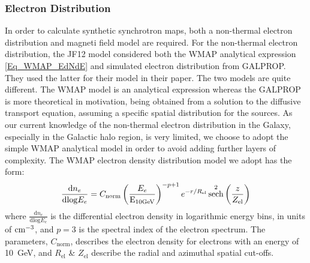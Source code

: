 \documentclass[usenatbib]{mnras}
\DeclareMathOperator{\sech}{sech}
\begin{document}
\subsubsection{Electron Distribution}

In order to calculate synthetic synchrotron maps, both a non-thermal electron distribution and magneti field model are required. For the non-thermal electron distribution, the JF12 model considered both the WMAP analytical expression \ref{Eq_WMAP_EdNdE} and simulated electron distribution from GALPROP. They used the latter for their model in their paper. The two models are quite different. The WMAP \cite{WMAP_Page} model is an analytical expression whereas the GALPROP \cite{Hammurabi} is more theoretical in motivation, being obtained from a solution to the diffusive transport equation, assuming a specific spatial distribution for the sources. As our current knowledge of the non-thermal electron distribution in the Galaxy, especially in the Galactic halo region, is very limited, we choose to adopt the simple WMAP analytical model in order to avoid adding further layers of complexity. The WMAP electron density distribution model we adopt has the form:
\begin{equation}\label{Eq_WMAP_EdNdE}
    \frac{\mathrm{d}n_e}{\mathrm{dlog}E_{e}} =     C_\mathrm{norm} \left(\frac{E_e}{\rm E_{\rm 10 GeV}}\right)^{-p+1} e^{-r/R_{\mathrm{el}}} \sech^2\left(\frac{z}{Z_{\mathrm{el}}}\right) 
\end{equation}
where $\frac{\mathrm{d}n_e}{\mathrm{dlog}E_{e}}$ is the differential electron density in logarithmic energy bins, in units of ${\rm cm}^{-3}$, and $p =3$ is the spectral index of the electron spectrum. The parameters, $C_\mathrm{norm}$, describes the electron density for electrons with an energy of 10~GeV, and $R_{\mathrm{el}}$ \& $Z_{\mathrm{el}}$ describe the radial and azimuthal spatial cut-offs. 
\end{document}
